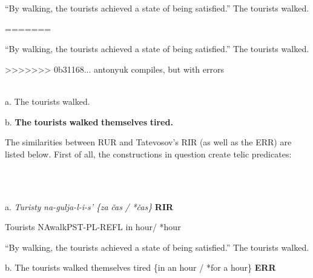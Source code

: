 \documentclass[output=paper,modfonts, nonflat]{langsci/langscibook}
\begin{document}
\begin{styleinnerExample}
    “By walking, the tourists achieved a state of being satisfied.” The tourists walked. 
\end{styleinnerExample}

\begin{styleinnerExample}
=======

\begin{styleinnerExample}
    “By walking, the tourists achieved a state of being satisfied.” The tourists walked. 
\end{styleinnerExample}

\begin{styleinnerExample}
>>>>>>> 0b31168... antonyuk compiles, but with errors
\ea%
    \label{ex:key:36}
    \gll\\
        \\
    \glt
    \z

          a.   The tourists walked.
\end{styleinnerExample}

\begin{styleinnerExample}
  b.   \textbf{The} \textbf{tourists} \textbf{walked} \textbf{themselves} \textbf{tired.} 
\end{styleinnerExample}

The similarities between RUR and Tatevosov’s RIR (as well as the ERR) are listed below. First of all, the constructions in question create telic predicates:\\

\begin{styleinnerExample}
\ea%
    \label{ex:key:37}
    \gll\\
        \\
    \glt
    \z

          a.  \textit{Turisty} \textit{na-gulja-l-i-s’}                 \textit{\{za} \textit{čas} \textit{/} \textit{*čas\}}   \textbf{RIR}
\end{styleinnerExample}

\begin{styleinnerExample}
  Tourists      NAwalkPST-PL-REFL in hour/ *hour
\end{styleinnerExample}

\begin{styleinnerExample}
  “By walking, the tourists achieved a state of being satisfied.” The tourists walked. 
\end{styleinnerExample}

\begin{styleinnerExample}
  b.  The tourists walked themselves tired \{in an hour / *for a hour\} \textbf{ERR}
\end{styleinnerExample}


\end{styleinnerExample}
\end{document}
